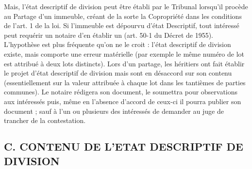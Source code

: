 		Mais, l'état descriptif de division peut être établi par le Tribunal lorsqu'il procède au Partage d'un immeuble, créant de la sorte la Copropriété dans les conditions de l'art. 1 de la loi.
		Si l'immeuble est dépourvu d'état Descriptif, tout intéressé peut requérir un notaire d'en établir un (art. 50-1 du Décret de 1955).
		L'hypothèse est plus fréquente qu'on ne le croit : l’état descriptif de division existe, mais comporte une erreur matérielle (par exemple le même numéro de lot est attribué à deux lots distincts). Lors d'un partage, les héritiers ont fait établir le projet d’état descriptif de division mais sont en désaccord sur son contenu (essentiellement sur la valeur attribuée à chaque lot dans les tantièmes de parties communes).
		Le notaire rédigera son document, le soumettra pour observations aux intéressés puis, même en l'absence d'accord de ceux-ci il pourra publier son document ; sauf à l'un ou plusieurs des intéressés de demander au juge de trancher de la contestation.
	
	\subsection{C. CONTENU DE L’ETAT DESCRIPTIF DE DIVISION}
	
